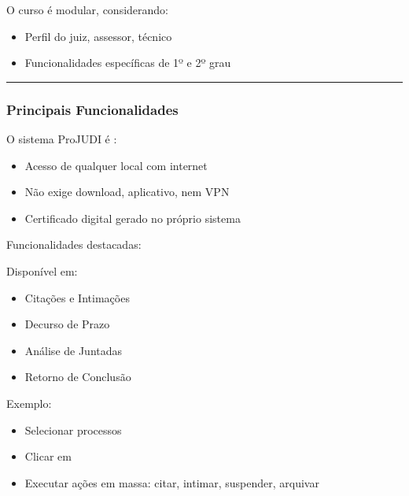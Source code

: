 \documentclass[letterpaper,10pt,brazil]{sphinxmanual}
\begin{document}
\sphinxAtStartPar
O curso é modular, considerando:
\begin{itemize}
\item {} 
\sphinxAtStartPar
Perfil do juiz, assessor, técnico

\item {} 
\sphinxAtStartPar
Funcionalidades específicas de 1º e 2º grau

\end{itemize}


\bigskip\hrule\bigskip



\subsubsection{Principais Funcionalidades}
\label{\detokenize{projud_01_visaogeral:principais-funcionalidades}}
\sphinxAtStartPar
O sistema ProJUDI é :
\begin{itemize}
\item {} 
\sphinxAtStartPar
Acesso de qualquer local com internet

\item {} 
\sphinxAtStartPar
Não exige download, aplicativo, nem VPN

\item {} 
\sphinxAtStartPar
Certificado digital gerado no próprio sistema

\end{itemize}

\sphinxAtStartPar
Funcionalidades destacadas:

\sphinxAtStartPar
{}

\sphinxAtStartPar
Disponível em:
\begin{itemize}
\item {} 
\sphinxAtStartPar
Citações e Intimações

\item {} 
\sphinxAtStartPar
Decurso de Prazo

\item {} 
\sphinxAtStartPar
Análise de Juntadas

\item {} 
\sphinxAtStartPar
Retorno de Conclusão

\end{itemize}

\sphinxAtStartPar
Exemplo:
\begin{itemize}
\item {} 
\sphinxAtStartPar
Selecionar processos

\item {} 
\sphinxAtStartPar
Clicar em 

\item {} 
\sphinxAtStartPar
Executar ações em massa: citar, intimar, suspender, arquivar

\end{itemize}
\end{document}
